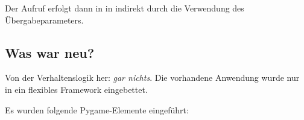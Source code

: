 
Der Aufruf erfolgt dann in  in  indirekt durch die Verwendung des Übergabeparameters.


\subsection*{Was war neu?}

Von der Verhaltenslogik her: \emph{gar nichts}. Die vorhandene Anwendung wurde nur in ein flexibles Framework eingebettet. 

Es wurden folgende Pygame-Elemente eingeführt:


